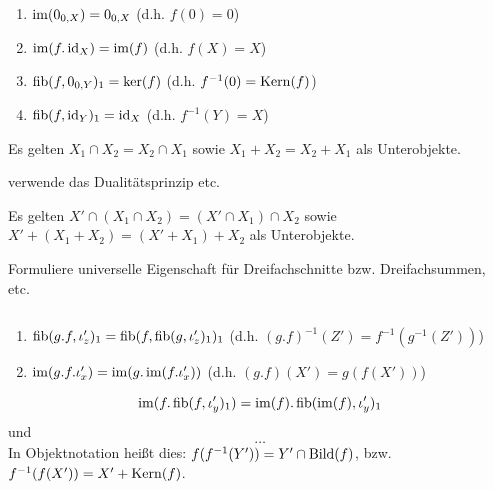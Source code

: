 \begin{lemm}[Regel (a)] $\quad$ %
\begin{enumerate}
\item $\operatorname{im}(0_{0,X}) = 0_{0,X}$ (d.h. $f(0) = 0$)
\item $\operatorname{im}(f.\operatorname{id}_X) = \operatorname{im}(f)$ (d.h. $f(X) = X$)
\item $\operatorname{fib}(f,0_{0,Y})_1 = \ker(f)$ (d.h. $f^{-1}(0) = \operatorname{Kern}(f)$)
\item $\operatorname{fib}(f,\operatorname{id}_Y)_1 = \operatorname{id}_X$ (d.h. $f^{-1}(Y) = X$)
\end{enumerate}
\end{lemm}

\begin{lemm}[Regel (b)]
Es gelten $X_1 \cap X_2 = X_2 \cap X_1$
sowie $X_1 + X_2 = X_2 + X_1$ als Unterobjekte.
\end{lemm}
\begin{bew}
verwende das Dualitätsprinzip etc.
\end{bew}

\begin{lemm}[Regel (c)]
Es gelten $X' \cap (X_1 \cap X_2) = (X' \cap X_1) \cap X_2$ 
sowie $X' + (X_1 + X_2) = (X' + X_1) + X_2$ als Unterobjekte.
\end{lemm}
\begin{bew}
Formuliere universelle Eigenschaft für Dreifachschnitte bzw. Dreifachsummen, etc.
\end{bew}

\begin{lemm}[Regel (d)] $\quad$ %
\begin{enumerate}
\item $\operatorname{fib}(g.f, \iota_z')_1 = \operatorname{fib}(f, \operatorname{fib}(g, \iota_z')_1)_1$ (d.h. $(g.f)^{-1}(Z') = f^{-1}(g^{-1}(Z'))$)
\item $\operatorname{im}(g.f.\iota_x') = \operatorname{im}(g.\operatorname{im}(f.\iota_x'))$ (d.h. $(g.f)(X') = g(f(X'))$)
\end{enumerate}
\end{lemm}

\begin{lemm}[Regel (e)]
\[
\operatorname{im}(f.\operatorname{fib}(f,\iota_y')_1) = \operatorname{im}(f).\operatorname{fib}(\operatorname{im}(f),\iota_y')_1
\]
und
\[
\ldots %
\]
In Objektnotation heißt dies: $f(f^{-1}(Y')) = Y' \cap \operatorname{Bild}(f)$, bzw. $f^{-1}(f(X')) = X' + \operatorname{Kern}(f)$.
\end{lemm}
